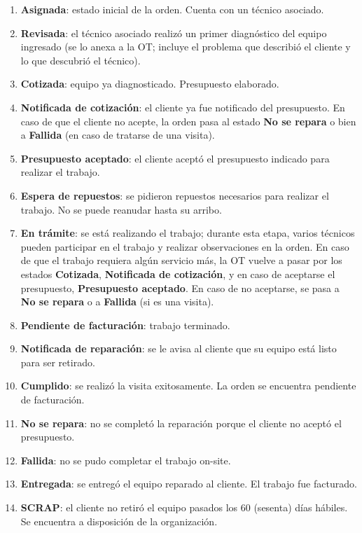 \documentclass[12pt]{extarticle}
\begin{document}
    \begin{enumerate}
        \item \textbf{Asignada}: estado inicial de la orden. Cuenta con un técnico asociado.
        \item \textbf{Revisada}: el técnico asociado realizó un primer diagnóstico del equipo ingresado (se lo anexa a la OT; incluye el problema que describió el cliente y lo que descubrió el técnico).
        \item \textbf{Cotizada}: equipo ya diagnosticado. Presupuesto elaborado.
        \item \textbf{Notificada de cotización}: el cliente ya fue notificado del presupuesto. En caso de que el cliente no acepte, la orden pasa al estado \textbf{No se repara} o bien a \textbf{Fallida} (en caso de tratarse de una visita). 
        \item \textbf{Presupuesto aceptado}: el cliente aceptó el presupuesto indicado para realizar el trabajo.
        \item \textbf{Espera de repuestos}: se pidieron repuestos necesarios para realizar el trabajo. No se puede reanudar hasta su arribo.
        \item \textbf{En trámite}: se está realizando el trabajo; durante esta etapa, varios técnicos pueden participar en el trabajo y realizar observaciones en la orden. En caso de que el trabajo requiera algún servicio más, la OT vuelve a pasar por los estados \textbf{Cotizada}, \textbf{Notificada de cotización}, y en caso de aceptarse el presupuesto, \textbf{Presupuesto aceptado}. En caso de no aceptarse, se pasa a \textbf{No se repara} o a \textbf{Fallida} (si es una visita).
        \item \textbf{Pendiente de facturación}: trabajo terminado. 
        \item \textbf{Notificada de reparación}: se le avisa al cliente que su equipo está listo para ser retirado.
        \item \textbf{Cumplido}: se realizó la visita exitosamente. La orden se encuentra pendiente de facturación.
        \item \textbf{No se repara}: no se completó la reparación porque el cliente no aceptó el presupuesto.
        \item \textbf{Fallida}: no se pudo completar el trabajo on-site.
        \item \textbf{Entregada}: se entregó el equipo reparado al cliente. El trabajo fue facturado.
        \item \textbf{SCRAP}: el cliente no retiró el equipo pasados los 60 (sesenta) días hábiles. Se encuentra a disposición de la organización.
    \end{enumerate}
\end{document}
